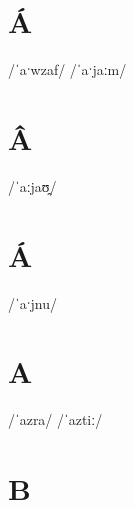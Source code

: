 \documentclass[10pt,a4paper,twoside]{book}
\begin{document}
\section*{Á}

\begin{multicols}{3}
 {/ˈaˑwzaf/} {}
 {/ˈaˑjaːm/} {}
\end{multicols}

\section*{Â}

\begin{multicols}{3}
 {/ˈaːjaʊ̯/} {}
\end{multicols}

\section*{Á}

\begin{multicols}{3}
 {/ˈaˑjnu/} {}
\end{multicols}

\section*{A}

\begin{multicols}{3}
 {/ˈazra/} {}
 {/ˈaztiː/} {}
\end{multicols}

\section*{B}
\end{document}

